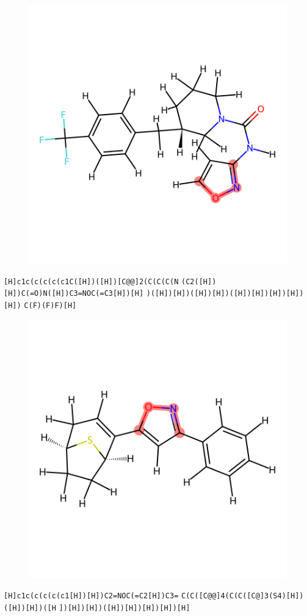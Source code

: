 \documentclass{article}
\begin{document}
\begin{figure}[ht]
\centering
    \includegraphics{mol08.png}
\end{figure}
\verb|[H]c1c(c(c(c(c1C([H])([H])[C@@]2(C(C(C(N| \verb|(C2([H])[H])C(=O)N([H])C3=NOC(=C3[H])[H]| \verb|)([H])[H])([H])[H])([H])[H])[H])[H])[H])| \verb|C(F)(F)F)[H]|

\begin{figure}[ht]
\centering
    \includegraphics{mol09.png}
\end{figure}
\verb|[H]c1c(c(c(c(c1[H])[H])C2=NOC(=C2[H])C3=| \verb|C(C([C@@]4(C(C([C@]3(S4)[H])([H])[H])([H| \verb|])[H])[H])([H])[H])[H])[H])[H]|
\end{document}
